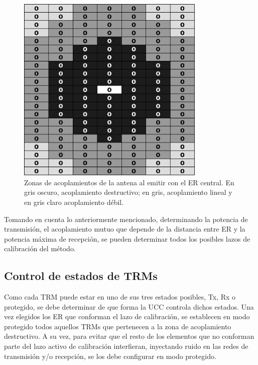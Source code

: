 \begin{figure}[H]
 \centering
 \includegraphics[width=9cm]{gfx/mutualCouplingLevels.png}
 \caption{Zonas de acoplamientos de la antena al emitir con el ER central. En gris oscuro, acoplamiento destructivo; en gris,
 acoplamiento lineal y en gris claro acoplamiento débil.}
 \label{fig:levels}
\end{figure}

Tomando en cuenta lo anteriormente mencionado, determinando la potencia de transmisión, el acoplamiento mutuo que depende de la
distancia entre ER y la potencia máxima de recepción, se pueden determinar todos los posibles lazos de calibración del método.


\subsection{Control de estados de TRMs}

Como cada TRM puede estar en uno de sus tres estados posibles, Tx, Rx o protegido, se debe determinar de que forma la UCC
controla dichos estados. Una vez elegidos los ER que conforman el lazo de calibración, se establecen en modo protegido todos
aquellos TRMs que pertenecen a la zona de acoplamiento destructivo. A su vez, para evitar que el resto de los elementos que no
conforman parte del lazo activo de calibración interfieran, inyectando ruido en las redes de transmisión y/o recepción, se los
debe configurar en modo protegido. 

